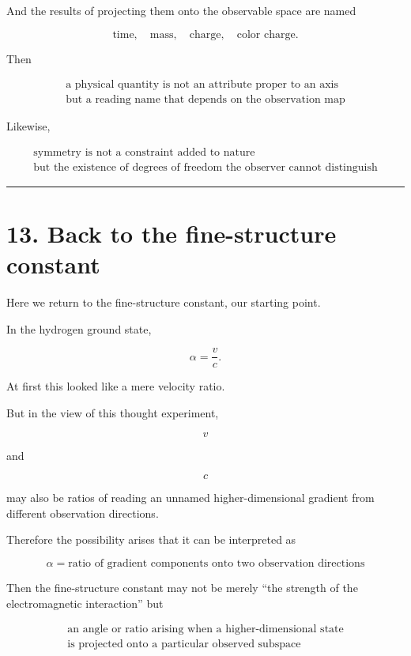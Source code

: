\documentclass[
  a4paper,
]{article}
\begin{document}
And the results of projecting them onto the observable space are named

\[
\text{time},
\quad
\text{mass},
\quad
\text{charge},
\quad
\text{color charge}.
\]

Then

\[
\boxed{
\begin{array}{c}
\text{a physical quantity is not an attribute proper to an axis}\\
\text{but a reading name that depends on the observation map}
\end{array}
}
\]

Likewise,

\[
\boxed{
\begin{array}{c}
\text{symmetry is not a constraint added to nature}\\
\text{but the existence of degrees of freedom the observer cannot distinguish}
\end{array}
}
\]

\begin{center}\rule{0.5\linewidth}{0.5pt}\end{center}

\section{13. Back to the fine-structure
constant}\label{back-to-the-fine-structure-constant}

Here we return to the fine-structure constant, our starting point.

In the hydrogen ground state,

\[
\alpha=\frac vc.
\]

At first this looked like a mere velocity ratio.

But in the view of this thought experiment,

\[
v
\]

and

\[
c
\]

may also be ratios of reading an unnamed higher-dimensional gradient
from different observation directions.

Therefore the possibility arises that it can be interpreted as

\[
\boxed{
\alpha
=
\text{ratio of gradient components onto two observation directions}
}
\]

Then the fine-structure constant may not be merely ``the strength of the
electromagnetic interaction'' but

\[
\boxed{
\begin{array}{c}
\text{an angle or ratio arising when a higher-dimensional state}\\
\text{is projected onto a particular observed subspace}
\end{array}
}
\]
\end{document}
